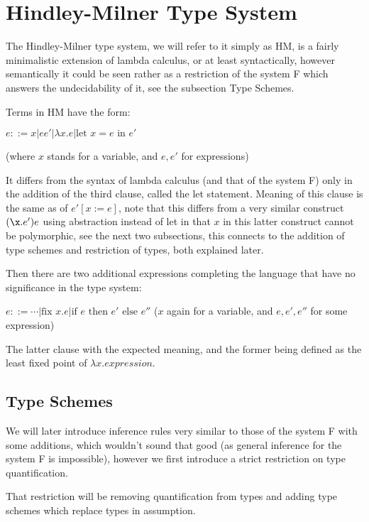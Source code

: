 \section{Hindley-Milner Type System}

The Hindley-Milner type system, we will refer to it simply as HM, is a fairly minimalistic extension of lambda calculus, or at least syntactically, however semantically it could be seen rather as a restriction of the system F which answers the undecidability of it, see the subsection Type Schemes. %

Terms in HM have the form:

$e ::= x | e e' | \lambda x . e | \text{let } x = e \text{ in } e'$

(where $x$ stands for a variable, and $e, e'$ for expressions)

It differs from the syntax of lambda calculus (and that of the system F) only in the addition of the third clause, called the let statement. Meaning of this clause is the same as of $e'[x := e]$, note that this differs from a very similar construct $(\x . e') e$ using abstraction instead of let in that $x$ in this latter construct cannot be polymorphic, see the next two subsections, this connects to the addition of type schemes and restriction of types, both explained later. %

Then there are two additional expressions completing the language that have no significance in the type system: %

$e ::= \cdots | \text{fix } x . e | \text{if } e \text{ then } e' \text{ else } e''$
($x$ again for a variable, and $e, e', e''$ for some expression)

The latter clause with the expected meaning, and the former being defined as the least fixed point of $\lambda x . expression$. %

\subsection{Type Schemes}

We will later introduce inference rules very similar to those of the system F with some additions, which wouldn't sound that good (as general inference for the system F is impossible), however we first introduce a strict restriction on type quantification.

That restriction will be removing quantification from types and adding type schemes which replace types in assumption.

